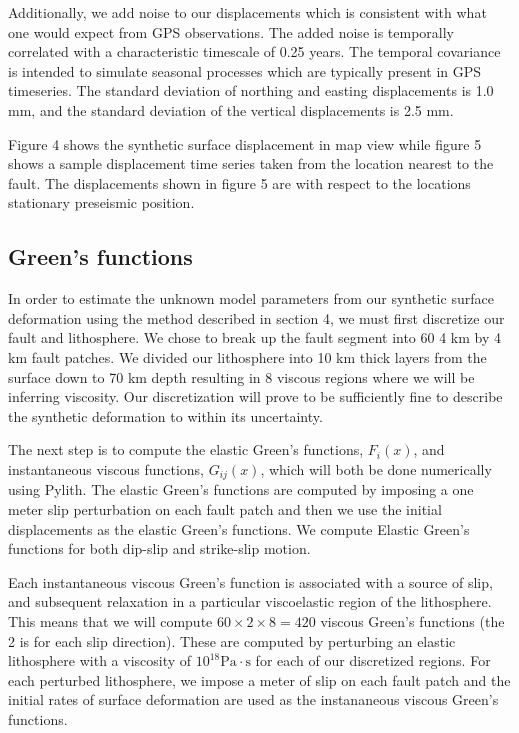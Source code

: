 \documentclass[12pt]{article}
\begin{document}
Additionally, we add noise to our displacements which is consistent
with what one would expect from GPS observations.  The added noise is
temporally correlated with a characteristic timescale of 0.25 years.
The temporal covariance is intended to simulate seasonal processes
which are typically present in GPS timeseries.  The standard deviation
of northing and easting displacements is 1.0 mm, and the standard
deviation of the vertical displacements is 2.5 mm.

Figure 4 shows the synthetic surface displacement in map view while
figure 5 shows a sample displacement time series taken from the
location nearest to the fault.  The displacements shown in figure 5
are with respect to the locations stationary preseismic position.  

\subsection{Green's functions}
In order to estimate the unknown model parameters from our
synthetic surface deformation using the method described in section 4,
we must first discretize our fault and lithosphere.  We chose
to break up the fault segment into 60 4 km by 4 km fault patches. We
divided our lithosphere into 10 km thick layers from the surface down
to 70 km depth resulting in 8 viscous regions where we will be
inferring viscosity. Our discretization will prove to be sufficiently
fine to describe the synthetic deformation to within its uncertainty.

The next step is to compute the elastic Green's functions, $F_i(x)$, and
instantaneous viscous functions, $G_{ij}(x)$, which will both be done
numerically using Pylith.  The elastic Green’s functions are computed
by imposing a one meter slip perturbation on each fault patch and then
we use the initial displacements as the elastic Green’s functions.  We
compute Elastic Green's functions for both dip-slip and
strike-slip motion. 

Each instantaneous viscous Green’s function is associated with a
source of slip, and subsequent relaxation in a particular viscoelastic
region of the lithosphere.  This means that we will compute
$60\times2\times8=420$ viscous Green's functions (the 2 is for each
slip direction).  These are computed by perturbing an elastic
lithosphere with a viscosity of $10^{18}\mathrm{Pa}\cdot\mathrm{s}$
for each of our discretized regions.  For each perturbed lithosphere,
we impose a meter of slip on each fault patch and the initial rates of
surface deformation are used as the instananeous viscous Green's
functions.
\end{document}
